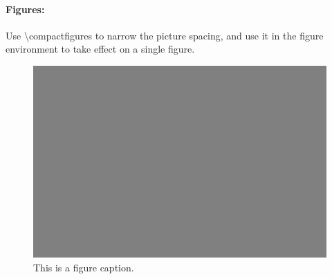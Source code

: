 \documentclass{lpsc_abstract}
\begin{document}
\paragraph{Figures:}
Use \textbackslash{compactfigures} to narrow the picture spacing, and use it in the figure environment to take effect on a single figure.

\compactfigures

\begin{figure}[!ht]
    \label{color_scales}
    \centering
    \includegraphics[width=\columnwidth]{figure.png}
    \caption{This is a figure caption.}
\end{figure}
\end{document}
